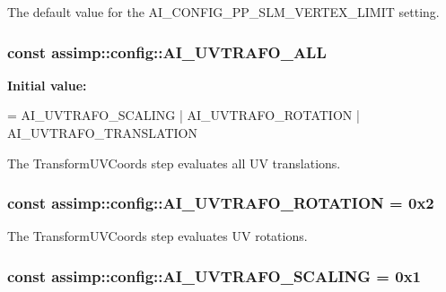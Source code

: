 The default value for the A\+I\+\_\+\+C\+O\+N\+F\+I\+G\+\_\+\+P\+P\+\_\+\+S\+L\+M\+\_\+\+V\+E\+R\+T\+E\+X\+\_\+\+L\+I\+M\+I\+T setting. \hypertarget{namespaceassimp_1_1config_a16cb07d1ce8bf8dc726c1d6150eb8dc0}{
\subsubsection[{A\+I\+\_\+\+U\+V\+T\+R\+A\+F\+O\+\_\+\+A\+L\+L}]{\setlength{\rightskip}{0pt plus 5cm}const assimp\+::config\+::\+A\+I\+\_\+\+U\+V\+T\+R\+A\+F\+O\+\_\+\+A\+L\+L}}\label{namespaceassimp_1_1config_a16cb07d1ce8bf8dc726c1d6150eb8dc0}
{\bfseries Initial value\+:}
\begin{DoxyCode}
=
      AI\_UVTRAFO\_SCALING
      | AI\_UVTRAFO\_ROTATION
      | AI\_UVTRAFO\_TRANSLATION
\end{DoxyCode}
The {\ttfamily Transform\+U\+V\+Coords} step evaluates all U\+V translations. \hypertarget{namespaceassimp_1_1config_ae93d5d4ab5e6ee436d8e3f4bb9f88e99}{
\subsubsection[{A\+I\+\_\+\+U\+V\+T\+R\+A\+F\+O\+\_\+\+R\+O\+T\+A\+T\+I\+O\+N}]{\setlength{\rightskip}{0pt plus 5cm}const assimp\+::config\+::\+A\+I\+\_\+\+U\+V\+T\+R\+A\+F\+O\+\_\+\+R\+O\+T\+A\+T\+I\+O\+N = 0x2}}\label{namespaceassimp_1_1config_ae93d5d4ab5e6ee436d8e3f4bb9f88e99}
The {\ttfamily Transform\+U\+V\+Coords} step evaluates U\+V rotations. \hypertarget{namespaceassimp_1_1config_a41b94fcbeccbf120bfdf0d1d0259b923}{
\subsubsection[{A\+I\+\_\+\+U\+V\+T\+R\+A\+F\+O\+\_\+\+S\+C\+A\+L\+I\+N\+G}]{\setlength{\rightskip}{0pt plus 5cm}const assimp\+::config\+::\+A\+I\+\_\+\+U\+V\+T\+R\+A\+F\+O\+\_\+\+S\+C\+A\+L\+I\+N\+G = 0x1}}\label{namespaceassimp_1_1config_a41b94fcbeccbf120bfdf0d1d0259b923}
